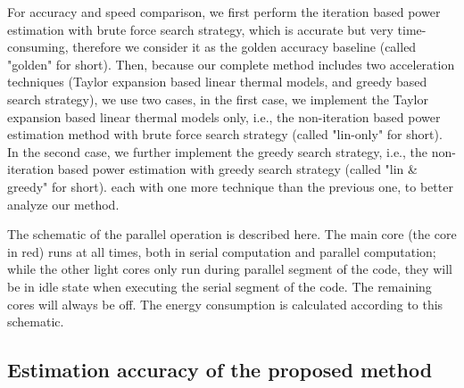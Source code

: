 For accuracy and speed comparison, we first perform the iteration based power estimation with brute force search strategy, which is accurate but very time-consuming, therefore we consider it as the golden accuracy baseline (called "golden" for short). Then, because our complete method includes two acceleration techniques (Taylor expansion based linear thermal models, and greedy based search strategy), we use two cases, in the first case, we implement the Taylor expansion based linear thermal models only, i.e., the non-iteration based power estimation method with brute force search strategy (called "lin-only" for short). In the second case, we further implement the greedy search strategy, i.e., the non-iteration based power estimation with greedy search strategy (called "lin \& greedy" for short). each with one more technique than the previous one, to better analyze our method. 

The schematic of the parallel operation is described here. The main core (the core in red) runs at all times, both in serial computation and parallel computation; while the other light cores only run during parallel segment of the code, they will be in idle state when executing the serial segment of the code. The remaining cores will always be off. The energy consumption is calculated according to this schematic.

\subsection{Estimation accuracy of the proposed method}

